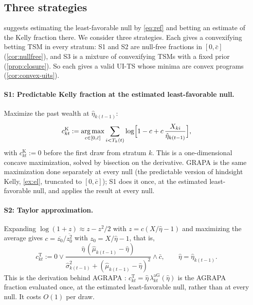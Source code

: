 \documentclass[11pt]{article}
\newcommand{\cbar}{\bar c}
\DeclareMathOperator*{\argmax}{arg\,max}
\theoremstyle{plain}
\theoremstyle{definition}
\theoremstyle{remark}
\begin{document}
\subsection{Three strategies}\label{sec:strategies}

 suggests estimating the least-favorable null by \eqref{eq:ref} and betting an estimate of the Kelly
fraction there.  We consider three strategies.  Each gives a convexifying betting TSM in every stratum: S1 and S2 are
null-free fractions in $[0,\cbar]$ (\cref{cor:nullfree}), and S3 is a mixture of convexifying TSMs with a fixed prior
(\cref{prop:closure}).  So each gives a valid UI-TS whose minima are convex programs (\cref{cor:convex-uits}).

\paragraph{S1: Predictable Kelly fraction at the estimated least-favorable null.}  Maximize the past wealth at
$\hat\eta_{k(t-1)}$:
\begin{equation}\label{eq:kelly-ref}
c^{\mathrm K}_{kt} := \argmax_{c\in[0,\cbar]}\sum_{i<T_k(t)}\log\Bigl[1-c+c\,\frac{X_{ki}}{\hat\eta_{k(t-1)}}\Bigr],
\end{equation}
with $c^{\mathrm K}_{kt}:=0$ before the first draw from stratum $k$.  This is a one-dimensional concave maximization,
solved by bisection on the derivative.  GRAPA is the same maximization done separately at every null (the
predictable version of hindsight Kelly, \cref{ex:el}, truncated to $[0,\cbar]$); S1 does it once, at the estimated
least-favorable null, and applies the result at every null.

\paragraph{S2: Taylor approximation.}  Expanding $\log(1+z)\approx z-z^2/2$ with $z=c(X/\hat\eta-1)$ and maximizing the
average gives $c=\overline{z_0}/\overline{z_0^2}$ with $z_0=X/\hat\eta-1$, that is,
\begin{equation}\label{eq:taylor-ref}
c^{\mathrm T}_{kt} := 0\vee\frac{\hat\eta\,(\hat\mu_{k(t-1)}-\hat\eta)}{\hat\sigma^2_{k(t-1)}+(\hat\mu_{k(t-1)}-\hat\eta)^2}\wedge\cbar,
\qquad \hat\eta=\hat\eta_{k(t-1)}.
\end{equation}
This is the derivation behind AGRAPA \citep{waudbysmith2024estimating}: $c^{\mathrm T}_{kt}=\hat\eta\,\lambda^{\mathrm{aG}}_{kt}(\hat\eta)$
is the AGRAPA fraction evaluated once, at the estimated least-favorable null, rather than at every null.  It costs
$O(1)$ per draw.
\end{document}
